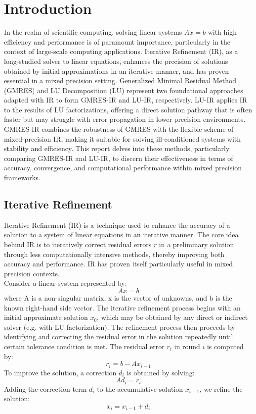 
\section{Introduction}
In the realm of scientific computing, solving linear systems $Ax=b$ with high efficiency and performance is of paramount importance, particularly in the context of large-scale computing applications. Iterative Refinement (IR), as a long-studied solver to linear equations, enhances the precision of solutions obtained by initial approximations in an iterative manner, and has proven essential in a mixed precision setting. Generalized Minimal Residual Method (GMRES) and LU Decomposition (LU) represent two foundational approaches adapted with IR to form GMRES-IR and LU-IR, respectively. LU-IR applies IR to the results of LU factorizations, offering a direct solution pathway that is often faster but may struggle with error propagation in lower precision environments. GMRES-IR combines the robustness of GMRES with the flexible scheme of mixed-precision IR, making it suitable for solving ill-conditioned systems with stability and efficiency. This report delves into these methods, particularly comparing GMRES-IR and LU-IR, to discern their effectiveness in terms of accuracy, convergence, and computational performance within mixed precision frameworks.

\subsection{Iterative Refinement}
Iterative Refinement (IR) is a technique used to enhance the accuracy of a solution to a system of linear equations in an iterative manner. The core idea behind IR is to iteratively correct residual errors $r$ in a preliminary solution through less computationally intensive methods, thereby improving both accuracy and performance. IR has proven itself particularly useful in mixed precision contexts.\\

Consider a linear system represented by:
\begin{equation}
Ax=b
\end{equation}
where A is a non-singular matrix, x is the vector of unknowns, and b is the known right-hand side vector. The iterative refinement process begins with an initial approximate solution $x_0$, which may be obtained by any direct or indirect solver (e.g. with LU factorization). The refinement process then proceeds by identifying and correcting the residual error in the solution repeatedly until certain tolerance condition is met.
The residual error $r_i$ in round $i$ is computed by:
\begin{equation}
r_i = b - Ax_{i-1}
\end{equation}
To improve the solution, a correction $d_i$ is obtained by solving:
\begin{equation}
Ad_i = r_i
\end{equation}
Adding the correction term $d_i$ to the accumulative solution $x_{i-1}$, we refine the solution:
\begin{equation}
x_i =x_{i-1} + d_i
\end{equation}

